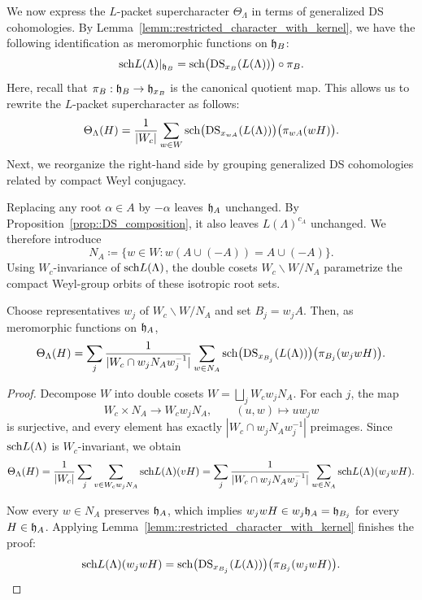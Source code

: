 We now express the $L$-packet supercharacter $\Theta_\Lambda$ in terms of generalized DS cohomologies. By Lemma~\ref{lemm::restricted_character_with_kernel}, we have the following identification as meromorphic functions on ${\mathfrak h}_{B}$:
\begin{equation}
{\operatorname{sch}} L(\Lambda)|_{{\mathfrak h}_B}
=
{\operatorname{sch}}\bigl(\operatorname{DS}_{x_B}(L(\Lambda))\bigr)\circ\pi_B.
\end{equation}
Here, recall that $\pi_B:{\mathfrak h}_B\to{\mathfrak h}_{x_B}$ is the canonical quotient map. This allows us to rewrite the $L$-packet supercharacter as follows:
\begin{equation}
\Theta_\Lambda(H)
=
\frac{1}{|W_c|}
\sum_{w\in W}
{\operatorname{sch}}\bigl(\operatorname{DS}_{x_{wA}}(L(\Lambda))\bigr)
\bigl(\pi_{wA}(wH)\bigr).
\end{equation}
Next, we reorganize the right-hand side by grouping generalized DS cohomologies related by compact Weyl conjugacy.  

Replacing any root $\alpha\in A$ by $-\alpha$ leaves ${\mathfrak h}_A$ unchanged. By Proposition~\ref{prop::DS_composition}, it also leaves $L(\Lambda)^{c_A}$ unchanged. We therefore introduce
\begin{equation}
N_A\coloneqq
\{w\in W:w(A\cup(-A))=A\cup(-A)\}.
\end{equation}
Using $W_{c}$-invariance of ${\operatorname{sch}} L(\Lambda)$, the double cosets
$
W_c\backslash W/N_A
$
parametrize the compact Weyl-group orbits of these isotropic root sets.

\begin{lemma}
\label{lemm::packet_DS_double_cosets}
Choose representatives $w_j$ of $W_c\backslash W/N_A$ and set $B_j=w_jA$. Then, as meromorphic functions on ${\mathfrak h}_A$,
\[
\Theta_\Lambda(H)
=
\sum_j
\frac{1}{|W_c\cap w_jN_Aw_j^{-1}|}
\sum_{w\in N_A}
{\operatorname{sch}}\bigl(\operatorname{DS}_{x_{B_j}}(L(\Lambda))\bigr)
\bigl(\pi_{B_j}(w_jwH)\bigr).
\]
\end{lemma}
\begin{proof}
Decompose $W$ into double cosets
$
W=\bigsqcup_j W_cw_jN_A.
$
For each $j$, the map
\[
W_c\times N_A\longrightarrow W_cw_jN_A,
\qquad
(u,w)\longmapsto uw_jw
\]
is surjective, and every element has exactly
$
|W_c\cap w_jN_Aw_j^{-1}|
$
preimages. Since ${\operatorname{sch}} L(\Lambda)$ is $W_c$-invariant, we obtain
\[
\begin{aligned}
\Theta_\Lambda(H)
=
\frac{1}{|W_c|}
\sum_j\sum_{v\in W_cw_jN_A}
{\operatorname{sch}} L(\Lambda)(vH)=
\sum_j
\frac{1}{|W_c\cap w_jN_Aw_j^{-1}|}
\sum_{w\in N_A}
{\operatorname{sch}} L(\Lambda)(w_jwH).
\end{aligned}
\]

Now every $w\in N_A$ preserves ${\mathfrak h}_A$, which implies
$
w_jwH\in w_j{\mathfrak h}_A={\mathfrak h}_{B_j}
$ for every $H\in {\mathfrak h}_{A}$.
Applying Lemma~\ref{lemm::restricted_character_with_kernel} finishes the proof:
\[
{\operatorname{sch}} L(\Lambda)(w_jwH)
=
{\operatorname{sch}}\bigl(\operatorname{DS}_{x_{B_j}}(L(\Lambda))\bigr)
\bigl(\pi_{B_j}(w_jwH)\bigr).\qedhere
\]
\end{proof}


